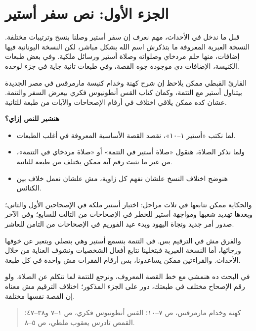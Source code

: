 \documentclass[12pt,a4paper]{article}
\begin{document}
\section*{الجزء الأول: نص سفر أستير}
قبل ما ندخل في الأحداث، مهم نعرف إن سفر أستير وصلنا بنسخ وترتيبات مختلفة. النسخة العبرية المعروفة ما بتذكرش اسم الله بشكل مباشر، لكن النسخة اليونانية فيها إضافات، منها حلم مردخاي وصلواته وصلاة أستير ورسائل ملكية. وفي بعض طبعات الكنيسة، الإضافات دي موجودة جوه القصة، وفي طبعات تانية جاية في جزء لوحده.\par\medskip
القارئ القبطي ممكن يلاحظ إن شرح كهنة وخدام كنيسة مارمرقس في مصر الجديدة بيتناول أستير مع التتمة، وكمان كتاب القس أنطونيوس فكري بيعرض السفر والتتمة. عشان كده ممكن يلاقي اختلاف في أرقام الإصحاحات والآيات من طبعة للتانية.\par\medskip
\vspace{0.2em}\noindent\textcolor{ochre}{\textbf{هنشير للنص إزاي؟}}\par\smallskip
\begin{itemize}[rightmargin=1.2em,leftmargin=0.5em,itemsep=0.25em,topsep=0.2em]
\item لما نكتب «أستير ١–١٠»، نقصد القصة الأساسية المعروفة في أغلب الطبعات.
\item ولما نذكر الصلاة، هنقول «صلاة أستير في التتمة» أو «صلاة مردخاي في التتمة»، من غير ما نثبت رقم آية ممكن يختلف من طبعة للتانية.
\item هنوضح اختلاف النسخ علشان نفهم كل زاوية، مش علشان نعمل خلاف بين الكنائس.
\end{itemize}\medskip
والحكاية ممكن نتابعها في تلات مراحل: اختيار أستير ملكة في الإصحاحين الأول والتاني؛ وبعدها تهديد شعبها ومواجهة أستير للخطر في الإصحاحات من التالت للسابع؛ وفي الآخر صدور أمر جديد ونجاة اليهود وبدء عيد الفوريم في الإصحاحات من التامن للعاشر.\par\medskip
والفرق مش في الترقيم بس. في التتمة بنسمع أستير وهي بتصلي وبتعبر عن خوفها ورجائها، أما النسخة العبرية فبتخلينا نتابع أفعال الشخصيات ونشوف العناية من خلال الأحداث. والقراءتين ممكن يساعدونا، بس أرقام الفقرات مش واحدة في كل طبعة.\par\medskip
في البحث ده هنمشي مع خط القصة المعروف، ونرجع للتتمة لما نتكلم عن الصلاة. ولو رقم الإصحاح مختلف في طبعتك، دور على الجزء المذكور؛ اختلاف الترقيم مش معناه إن القصة نفسها مختلفة.\par\medskip
\begin{quote}\small\color{muted}كهنة وخدام مارمرقس، ص ٧–١٠؛ القس أنطونيوس فكري، ص ١–٧ و٣٨–٤٧؛ القمص تادرس يعقوب ملطي، ص ٥–٨.\end{quote}
\clearpage
\clearpage
\end{document}
